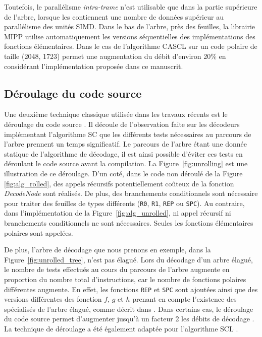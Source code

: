Toutefois, le parallélisme \textit{intra-trame} n'est utilisable que dans la partie supérieure de l'arbre, lorsque les \noeuds contiennent une nombre de données supérieur au parallélisme des unités SIMD. Dans le bas de l'arbre, près des feuilles, la librairie MIPP \cite{cassagne_efficient_2015} utilise automatiquement les versions séquentielles des implémentations des fonctions élémentaires. Dans le cas de l'algorithme CASCL sur un code polaire de taille (2048, 1723) permet une augmentation du débit d'environ 20\% en considérant l'implémentation proposée dans ce manuscrit.


\subsection{Déroulage du code source}
\label{subsec:unroll}
Une deuxième technique classique utilisée dans les travaux récents est le déroulage du code source \cite{sarkis_autogenerating_2014,giard_fast_2014,cassagne_efficient_2015,cassagne_energy_2016}. Il découle de l'observation faite sur les décodeurs implémentant l'algorithme SC que les différents tests nécessaires au parcours de l'arbre prennent un temps significatif. Le parcours de l'arbre étant une donnée statique de l'algorithme de décodage, il est ainsi possible d'éviter ces tests en \og déroulant \fg le code source avant la compilation. La Figure~\ref{fig:unrolling} est une illustration de ce déroulage. D'un coté, dans le code non déroulé de la Figure \ref{fig:alg_rolled}, des appels récursifs potentiellement coûteux de la fonction \textit{DecodeNode} sont réalisés. De plus, des branchements conditionnels sont nécessaire pour traiter des feuilles de types différents (\texttt{R0}, \texttt{R1}, \texttt{REP} ou \texttt{SPC}). Au contraire, dans l'implémentation de la Figure~\ref{fig:alg_unrolled}, ni appel récursif ni branchements conditionnels ne sont nécessaires. Seules les fonctions élémentaires polaires sont appelées.

De plus, l'arbre de décodage que nous prenons en exemple, dans la Figure~\ref{fig:unrolled_tree}, n'est pas élagué. Lors du décodage d'un arbre élagué, le nombre de tests effectués au cours du parcours de l'arbre augmente en proportion du nombre total d'instructions, car le nombre de fonctions polaires différentes augmente. En effet, les fonctions \texttt{REP} et \texttt{SPC} sont ajoutées ainsi que des versions différentes des fonction $f$, $g$ et $h$ prenant en compte l'existence des \noeuds spécialisés de l'arbre élagué, comme décrit dans \cite{sarkis_fast_2014,cassagne_efficient_2015}. Dans certains cas, le déroulage du code source permet d'augmenter jusqu'à un facteur 2 les débits de décodage \cite{sarkis_autogenerating_2014}. La technique de déroulage a été également adaptée pour l'algorithme SCL \cite{sarkis_fast_2016}.

